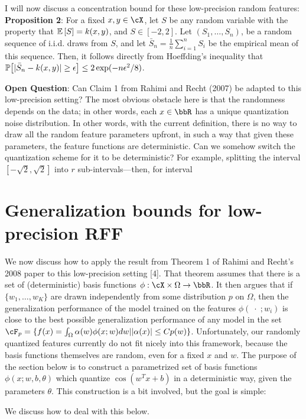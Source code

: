 \documentclass[12pt]{article}
\newcommand{\bS}{\bar{S}}
\newcommand{\sq}{\sqrt{2}}
\newcommand{\eps}{\epsilon}
\begin{document}
I will now discuss a concentration bound for these low-precision random features:\\
\textbf{Proposition 2}: For a fixed $x,y\in\cX$, let $S$ be any random variable with the property that $\expect{}{S} = k(x,y)$, and $S \in [-2,2]$.  Let $(S_1,\ldots,S_n)$, be a random sequence of i.i.d. draws from $S$, and let $\bS_n = \frac{1}{n}\sum_{i=1}^n S_i$ be the empirical mean of this sequence.  Then, it follows directly from Hoeffding's inequality that $\Prob{\big[|\bS_n - k(x,y)| \geq \epsilon\big]} \leq 2\exp(-n\eps^2/8)$.

\textbf{Open Question}: Can Claim 1 from Rahimi and Recht (2007) be adapted to this low-precision setting?  The most obvious obstacle here is that the randomness depends on the data; in other words, each $x \in \RR$ has a unique quantization noise distribution.  In other words, with the current definition, there is no way to draw all the random feature parameters upfront, in such a way that given these parameters, the feature functions are deterministic.  Can we somehow switch the quantization scheme for it to be deterministic?  For example, splitting the interval $[-\sq,\sq]$ into $r$ sub-intervals---then, for interval

\section{Generalization bounds for low-precision RFF}
We now discuss how to apply the result from Theorem 1 of Rahimi and Recht's 2008 paper to this low-precision setting [4].  That theorem assumes that there is a set of (deterministic) basis functions $\phi: \cX \times \Omega \rightarrow \RR$.  It then argues that if $\{w_1,\ldots,w_K\}$ are drawn independently from some distribution $p$ on $\Omega$, then the generalization performance of the model trained on the features $\phi(\;\cdot\;;w_i)$ is close to the best possible generalization performance of any model in the set $\cF_p = \{f(x) = \int_\Omega \alpha(w)\phi(x;w)dw | |\alpha(x)| \leq Cp(w)\}$.  Unfortunately, our randomly quantized features currently do not fit nicely into this framework, because the basis functions themselves are random, even for a fixed $x$ and $w$.  The purpose of the section below is to construct a parametrized set of basis functions $\phi(x;w,b,\theta)$ which quantize $\cos(w^Tx+b)$ in a deterministic way, given the parameters $\theta$.  This construction is a bit involved, but the goal is simple: 

We discuss how to deal with this below.
\end{document}
